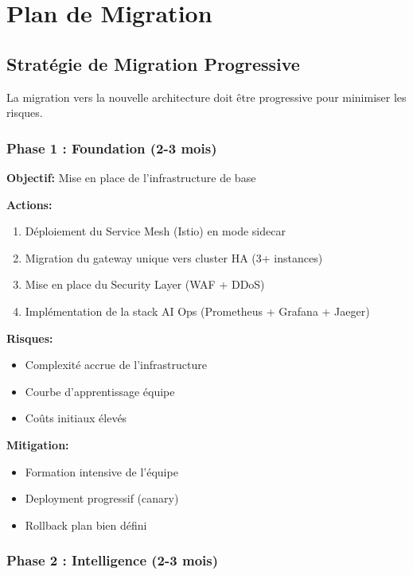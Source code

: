 \documentclass[12pt,a4paper]{article}
\begin{document}
\newpage
\section{Plan de Migration}

\subsection{Stratégie de Migration Progressive}

La migration vers la nouvelle architecture doit être progressive pour minimiser les risques.

\subsubsection{Phase 1 : Foundation (2-3 mois)}

\begin{tcolorbox}[title=Phase 1: Fondations,colback=blue!5]
\textbf{Objectif:} Mise en place de l'infrastructure de base

\textbf{Actions:}
\begin{enumerate}[noitemsep]
    \item Déploiement du Service Mesh (Istio) en mode sidecar
    \item Migration du gateway unique vers cluster HA (3+ instances)
    \item Mise en place du Security Layer (WAF + DDoS)
    \item Implémentation de la stack AI Ops (Prometheus + Grafana + Jaeger)
\end{enumerate}

\textbf{Risques:}
\begin{itemize}[noitemsep]
    \item Complexité accrue de l'infrastructure
    \item Courbe d'apprentissage équipe
    \item Coûts initiaux élevés
\end{itemize}

\textbf{Mitigation:}
\begin{itemize}[noitemsep]
    \item Formation intensive de l'équipe
    \item Deployment progressif (canary)
    \item Rollback plan bien défini
\end{itemize}
\end{tcolorbox}

\subsubsection{Phase 2 : Intelligence (2-3 mois)}
\end{document}
